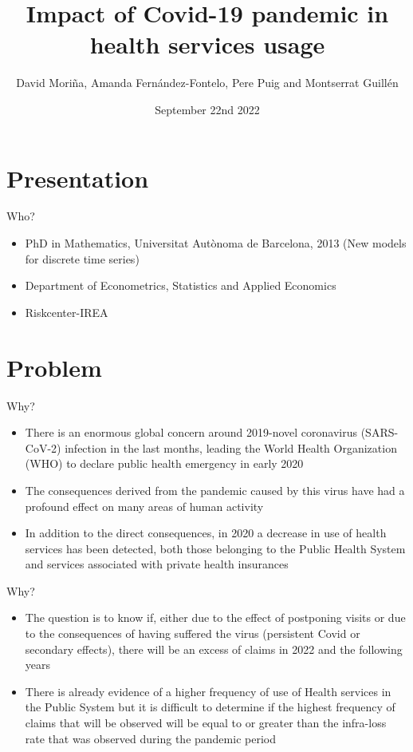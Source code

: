 \documentclass[aspectratio=169,usepdftitle=true]{beamer}
\title{Impact of Covid-19 pandemic in health services usage}
\institute{UB School of Economics Young Research Meeting}
\date{September 22nd 2022}
\author{David Mori\~na, Amanda Fern\'andez-Fontelo, Pere Puig and Montserrat Guill\'en}
\begin{document}
\section{Presentation}
\begin{frame}{Who?}
\begin{itemize}
  \item PhD in Mathematics, Universitat Autònoma de Barcelona, 2013 (New models for discrete time series)
  \item Department of Econometrics, Statistics and Applied Economics
  \item Riskcenter-IREA 
\end{itemize}
\end{frame}

\section{Problem}
\begin{frame}{Why?}
\begin{itemize}
 \item There is an enormous global concern around 2019-novel coronavirus (SARS-CoV-2)
infection in the last months, leading the World Health Organization (WHO) to declare
public health emergency in early 2020
 \item The consequences derived from the pandemic
caused by this virus have had a profound effect on many areas of human activity
 \item In addition to the direct consequences, in 2020 a decrease in use of health services has been detected, both those belonging to the Public Health System and services associated with private health insurances
\end{itemize}
\end{frame}

\begin{frame}{Why?}
\begin{itemize}
 \item The question is to know if, either due to the effect of
postponing visits or due to the consequences of having suffered the virus (persistent Covid
or secondary effects), there will be an excess of claims in 2022 and the following years
 \item There is already evidence of a higher frequency of use of Health services in the Public
System but it is difficult to determine if the highest frequency of
claims that will be observed will be equal to or greater than the infra-loss rate that was
observed during the pandemic period
\end{itemize}
\end{frame}
\end{document}
